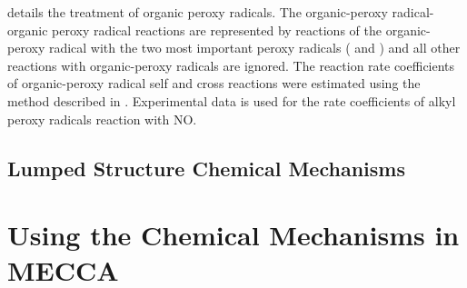 \citep{Kirchner:1996} details the treatment of organic peroxy radicals. 
The organic-peroxy radical-organic peroxy radical reactions are represented by reactions of the organic-peroxy radical with the two most important peroxy radicals ( and ) and all other reactions with organic-peroxy radicals are ignored. 
The reaction rate coefficients of organic-peroxy radical self and cross reactions were estimated using the method described in \citep{Kirchner:1996}. 
Experimental data is used for the rate coefficients of alkyl peroxy radicals reaction with NO. 

\subsection{Lumped Structure Chemical Mechanisms} \label{ss:lumped_structure}

\section{Using the Chemical Mechanisms in MECCA}
